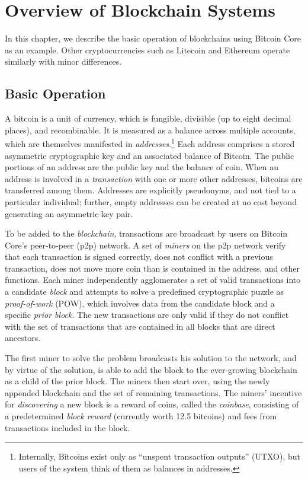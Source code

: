 \chapter{Overview of Blockchain Systems}

In this chapter, we describe the basic operation of blockchains using Bitcoin Core as an example. Other cryptocurrencies such as Litecoin and Ethereum operate similarly with minor differences.

\section{Basic Operation}

 A bitcoin is a unit of currency, which is
fungible, divisible (up to eight decimal places), and recombinable.
It is measured as a balance across multiple accounts, which are
themselves manifested in \emph{addresses}.$\!$\footnote{Internally,
  Bitcoins exist only as ``unspent transaction outputs'' (UTXO), but
  users of the system think of them as balances in addresses. } Each address
comprises a stored asymmetric cryptographic key and an associated
balance of Bitcoin. The public portions of an address are the public
key and the balance of coin. When an address is involved in a
\emph{transaction} with one or more other addresses, bitcoins are
transferred among them. Addresses are explicitly pseudonyms, and not tied to a particular 
individual; further, empty addresses can be created at no cost beyond
 generating an asymmetric key pair.

 To be added to the {\em blockchain},
transactions are broadcast by users on Bitcoin Core's peer-to-peer (p2p) network. A set of
\emph{miners} on the p2p network verify that each transaction is
signed correctly, does not conflict with a previous transaction, does not
move more coin than is contained in the address, and other functions.
Each miner independently agglomerates a set of valid transactions into
a candidate \emph{block} and attempts to solve a predefined
cryptographic puzzle as {\em proof-of-work} (POW), which involves data
from the candidate block and a specific {\em prior block}. The
new transactions  are only valid if they do not
conflict with the set of transactions that are contained in all
blocks that are direct ancestors.

The first miner to solve the problem broadcasts his solution to the
network, and by virtue of the solution, is able to add the block to
the ever-growing blockchain as a child of the prior block. The miners
then start over, using the newly appended blockchain and the set of
remaining transactions. The miners' incentive for {\em discovering}
a new block is a reward of coins, called the {\em coinbase},
consisting of a predetermined {\em block reward} (currently worth 12.5 bitcoins)
and fees from transactions included in the block.

